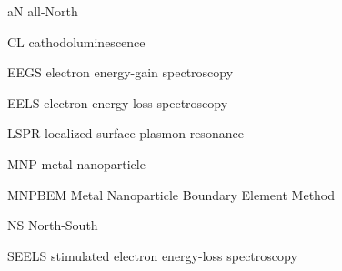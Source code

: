\documentclass [11pt, proquest] {uwthesis}[2016/11/22]
\begin{document}
\begin{glossary}
\item[aN] all-North
\item[CL] cathodoluminescence
\item[EEGS] electron energy-gain spectroscopy
\item[EELS] electron energy-loss spectroscopy
\item[LSPR] localized surface plasmon resonance
\item[MNP] metal nanoparticle
\item[MNPBEM] Metal Nanoparticle Boundary Element Method
\item[NS] North-South
\item[SEELS] stimulated electron energy-loss spectroscopy

\end{glossary}
 
\end{document}
